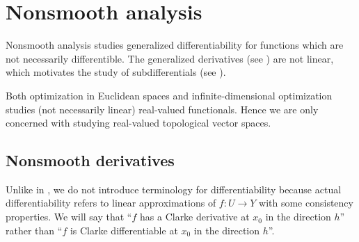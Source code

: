 \section{Nonsmooth analysis}\label{sec:nonsmooth_analysis}

\begin{remark}\label{rem:nonsmooth_analysis}
  Nonsmooth analysis studies generalized differentiability for functions which are not necessarily differentible. The generalized derivatives (see ) are not linear, which motivates the study of subdifferentials (see ).

  Both optimization in Euclidean spaces and infinite-dimensional optimization studies (not necessarily linear) real-valued functionals. Hence we are only concerned with studying real-valued topological vector spaces.
\end{remark}

\subsection{Nonsmooth derivatives}\label{subsec:nonsmooth_derivatives}

\begin{remark}\label{rem:nonsmooth_differentiability}
  Unlike in , we do not introduce terminology for differentiability because actual differentiability refers to linear approximations of \( f: U \to Y \) with some consistency properties. We will say that \enquote{\( f \) has a Clarke derivative at \( x_0 \) in the direction \( h \)} rather than \enquote{\( f \) is Clarke differentiable at \( x_0 \) in the direction \( h \)}.
\end{remark}

